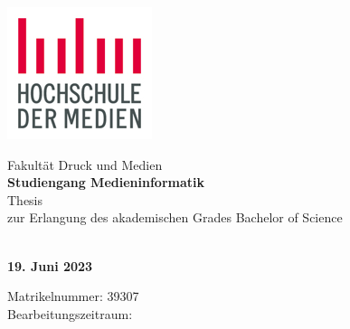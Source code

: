\begin{titlepage}
\begin{center}

\begin{minipage}[b]{.25\linewidth}
    \centering
    \includegraphics[width=\linewidth]{./Pictures/HdM_Logo.jpg}
\end{minipage}

\normalsize{Fakultät Druck und Medien}\\
\large{\textbf{Studiengang Medieninformatik}}\\[0.5cm]

\LARGE{{\thesisType} Thesis}\\
\normalsize{zur Erlangung des akademischen Grades Bachelor of Science}\\[0.7cm]
\Huge{\textbf{\thesisTitle}}



\vspace{1cm} 

\Large{\textbf{\name}} \\[3pt]  

\large{\textbf{19. Juni 2023}}

\vspace{0.3cm} 

\large{Matrikelnummer: 39307} \\
\large{Bearbeitungszeitraum: \timeFrame} \\ 


\end{center}
\end{titlepage}
